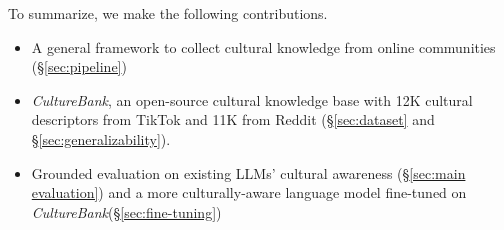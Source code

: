 \documentclass{article} %
\newcommand{\dataname}{\textit{CultureBank}\xspace}
\begin{document}
To summarize, we make the following contributions. 
\begin{itemize}
    \item A general framework to collect cultural knowledge from online communities (\S\ref{sec:pipeline})
    \item \dataname, an open-source cultural knowledge base with 12K cultural descriptors from TikTok and 11K from Reddit (\S\ref{sec:dataset} and \S\ref{sec:generalizability}).
    \item Grounded evaluation on existing LLMs' cultural awareness (\S\ref{sec:main evaluation}) and a more culturally-aware language model fine-tuned on \dataname (\S\ref{sec:fine-tuning}) 
\end{itemize}

\vspace{-1em}
\end{document}
